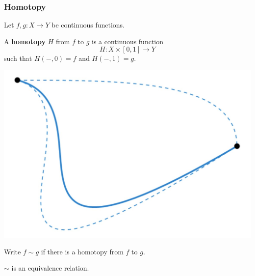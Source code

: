 \documentclass[handout]{beamer} %
\begin{document}
\begin{frame}
  \frametitle{Homotopy}

  Let $f, g : X \to Y$ be continuous functions.

  \begin{definition}
    A \textbf{homotopy} $H$ from $f$ to $g$ is a continuous function
    \[
      H : X \times [0, 1] \to Y
    \]
    such that $H(-, 0) = f$ and $H(-, 1) = g$.
  \end{definition}
  
  \begin{center}
    \includegraphics[scale=0.2]{Homotopy.jpg}
  \end{center}

  Write $f \sim g$ if there is a homotopy from $f$ to $g$.

  $\sim$ is an equivalence relation.
\end{frame}

\end{document}
